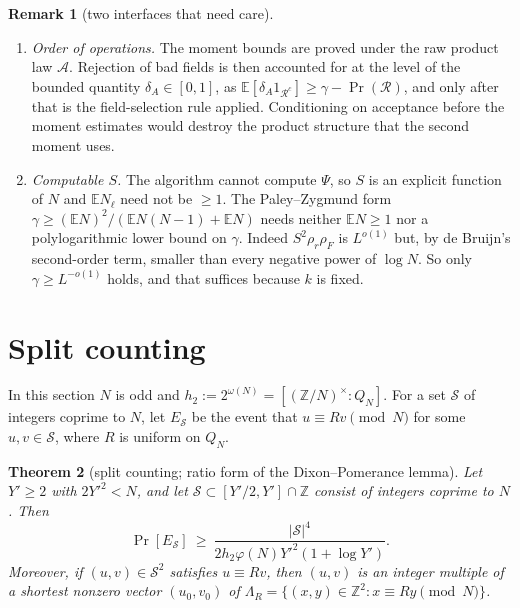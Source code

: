 \documentclass[11pt]{amsart}
\newtheorem{theorem}{Theorem}[section]
\theoremstyle{definition}
\newtheorem{remark}[theorem]{Remark}
\newcommand{\Z}{\mathbb{Z}}
\newcommand{\cA}{\mathcal{A}}
\newcommand{\cR}{\mathcal{R}}
\newcommand{\cS}{\mathcal{S}}
\newcommand{\rr}{\rho_r}
\newcommand{\rF}{\rho_F}
\newcommand{\Ex}{\mathbb{E}}
\newcommand{\Prob}{\Pr}
\begin{document}
\begin{remark}[two interfaces that need care]\label{rem:interfaces}
\begin{enumerate}[label=(\alph*)]
\item \emph{Order of operations.} The moment bounds are proved under the raw product law $\cA$. Rejection
  of bad fields is then accounted for at the level of the bounded quantity $\delta_A\in[0,1]$, as
  $\Ex[\delta_A1_{\cR^c}]\ge\gamma-\Prob(\cR)$, and only after that is the field-selection rule applied. Conditioning on
  acceptance before the moment estimates would destroy the product structure that the second moment
  uses.
\item \emph{Computable $S$.} The algorithm cannot compute $\Psi$, so $S$ is an explicit function of $N$
  and $\Ex N_\ell$ need not be $\ge1$. The Paley--Zygmund form $\gamma\ge(\Ex N)^2/(\Ex N(N-1)+\Ex N)$ needs
  neither $\Ex N\ge1$ nor a polylogarithmic lower bound on $\gamma$. Indeed $S^2\rr\rF$ is $L^{o(1)}$ but,
  by de Bruijn's second-order term, smaller than every negative power of $\log N$. So only
  $\gamma\ge L^{-o(1)}$ holds, and that suffices because $k$ is fixed.
\end{enumerate}
\end{remark}

\section{Split counting}\label{sec:split}

In this section $N$ is odd and $h_2:=2^{\omega(N)}=[(\Z/N)^\times:Q_N]$. For a set $\cS$ of integers coprime to $N$, let $E_\cS$
be the event that $u\equiv Rv\pmod N$ for some $u,v\in\cS$, where $R$ is uniform on $Q_N$.

\begin{theorem}[split counting; ratio form of the Dixon--Pomerance lemma]\label{thm:S}
Let $Y'\ge2$ with $2Y'^2<N$, and let $\cS\subset[Y'/2,Y']\cap\Z$ consist of integers coprime to $N$. Then
\[
\Prob[E_\cS]\ \ge\ \frac{|\cS|^4}{2h_2\varphi(N)Y'^2(1+\log Y')}.
\]
Moreover, if $(u,v)\in\cS^2$ satisfies $u\equiv Rv$, then $(u,v)$ is an integer multiple of a shortest nonzero
vector $(u_0,v_0)$ of $\Lambda_R=\{(x,y)\in\Z^2:x\equiv Ry\pmod N\}$.
\end{theorem}
\end{document}
